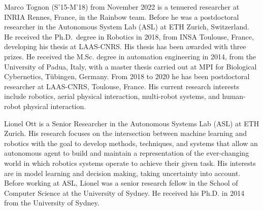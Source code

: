 \documentclass[journal]{IEEEtran}  %
\begin{document}
\vspace{-1cm}
\begin{IEEEbiography}{Marco Tognon}
(S'15-M'18) from November 2022 is a tenuered researcher at INRIA Rennes, France, in the Rainbow team. Before he was a postdoctoral researcher in the Autonomous System Lab (ASL) at ETH Zurich, Switzerland.
He received the Ph.D.~degree in Robotics in 2018, from INSA Toulouse, France, developing his thesis at LAAS-CNRS.
His thesis has been awarded with three prizes. 
He received the M.Sc. degree in automation engineering in 2014, from the University of Padua, Italy, with a master thesis carried out at MPI for Biological Cybernetics, T\"ubingen, Germany.
From 2018 to 2020 he has been postdoctoral researcher at LAAS-CNRS, Toulouse, France. 
His current research interests include robotics, aerial physical interaction, multi-robot systems, and human-robot physical interaction.
\end{IEEEbiography}
\vspace{-1cm}
\begin{IEEEbiography}{Lionel Ott} is a Senior Researcher in the Autonomous Systems Lab (ASL) at ETH Zurich. His research focuses on the intersection between machine learning and robotics with the goal to develop methods, techniques, and systems that allow an autonomous agent to build and maintain a representation of the ever-changing world in which robotics systems operate to achieve their given task. His interests are in model learning and decision making, taking uncertainty into account. Before working at ASL, Lionel was a senior research fellow in the School of Computer Science at the University of Sydney. He received his Ph.D. in 2014 from the University of Sydney.
\end{IEEEbiography}
\end{document}
